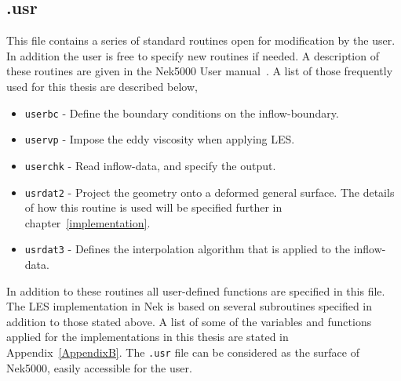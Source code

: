 \subsection{.usr}
This file contains a series of standard routines open for modification by the user. In addition the user is free to specify 
new routines if needed. A description of these routines are given in the Nek5000 User manual~\cite{Nek}. A list of those 
frequently used for this thesis are described below, 
%
%
\begin{itemize}
    \item \verb|userbc| - Define the boundary conditions on the inflow-boundary. 
    \item \verb|uservp| - Impose the eddy viscosity when applying LES. 
    \item \verb|userchk| - Read inflow-data, and specify the output.
    \item \verb|usrdat2| - Project the geometry onto a deformed general surface. The details of how this routine is used will be 
    specified further in chapter~\ref{implementation}. 
    \item \verb|usrdat3| - Defines the interpolation algorithm that is applied to the inflow-data. 
\end{itemize}
%
In addition to these routines all user-defined functions are specified in this file. The LES implementation in Nek is based
on several subroutines specified in addition to those stated above. A list of some of the variables and functions 
applied for the implementations in this thesis are stated in Appendix~\ref{AppendixB}.
The \verb|.usr| file can be considered as the surface of Nek5000, easily accessible for the user.

